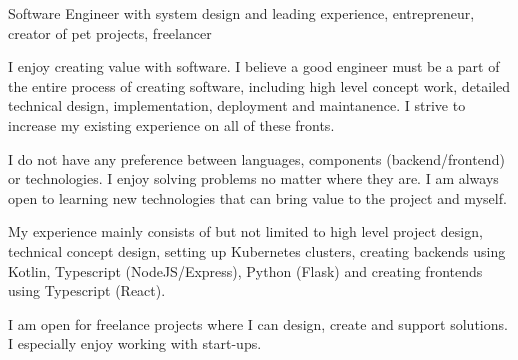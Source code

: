 


\begin{cvparagraph}

Software Engineer with system design and leading experience, entrepreneur, creator of pet projects, freelancer

I enjoy creating value with software. I believe a good engineer must be a part of the entire process of creating software, including high level concept work, detailed technical design, implementation, deployment and maintanence. I strive to increase my existing experience on all of these fronts.

I do not have any preference between languages, components (backend/frontend) or technologies. I enjoy solving problems no matter where they are. I am always open to learning new technologies that can bring value to the project and myself.

My experience mainly consists of but not limited to high level project design, technical concept design, setting up Kubernetes clusters, creating backends using Kotlin, Typescript (NodeJS/Express), Python (Flask) and creating frontends using Typescript (React).

I am open for freelance projects where I can design, create and support solutions. I especially enjoy working with start-ups.

\end{cvparagraph}